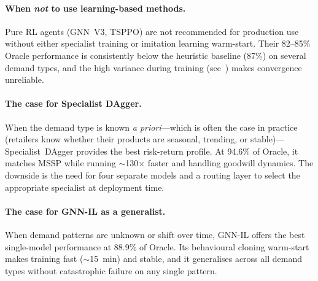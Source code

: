 \paragraph{When \emph{not} to use learning-based methods.}
Pure RL agents (GNN~V3, TSPPO) are not recommended for production use
without either specialist training or imitation learning warm-start.
Their 82--85\% Oracle performance is consistently below the heuristic
baseline (87\%) on several demand types, and the high variance during
training (see~) makes convergence unreliable.

\paragraph{The case for Specialist DAgger.}
When the demand type is known \emph{a priori}---which is often the case
in practice (retailers know whether their products are seasonal,
trending, or stable)---Specialist~DAgger provides the best risk-return
profile. At 94.6\% of Oracle, it matches MSSP while running
$\sim$130$\times$ faster and handling goodwill dynamics.
The downside is the need for four separate models and a routing
layer to select the appropriate specialist at deployment time.

\paragraph{The case for GNN-IL as a generalist.}
When demand patterns are unknown or shift over time, GNN-IL offers the
best single-model performance at 88.9\% of Oracle. Its behavioural
cloning warm-start makes training fast ($\sim$15~min) and stable,
and it generalises across all demand types without catastrophic failure
on any single pattern.

